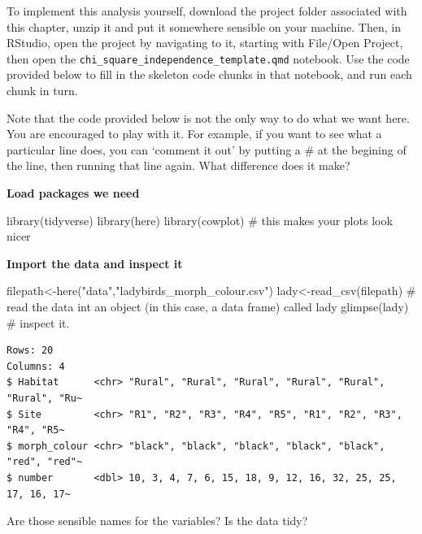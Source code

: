\documentclass[
  letterpaper,
  DIV=11,
  numbers=noendperiod]{scrreprt}
\newenvironment{Shaded}{\begin{snugshade}}{\end{snugshade}}
\newcommand{\CommentTok}[1]{\textcolor[rgb]{0.37,0.37,0.37}{#1}}
\newcommand{\FunctionTok}[1]{\textcolor[rgb]{0.28,0.35,0.67}{#1}}
\newcommand{\NormalTok}[1]{\textcolor[rgb]{0.00,0.23,0.31}{#1}}
\newcommand{\OtherTok}[1]{\textcolor[rgb]{0.00,0.23,0.31}{#1}}
\newcommand{\StringTok}[1]{\textcolor[rgb]{0.13,0.47,0.30}{#1}}
\begin{document}
To implement this analysis yourself, download the project folder
associated with this chapter, unzip it and put it somewhere sensible on
your machine. Then, in RStudio, open the project by navigating to it,
starting with File/Open Project, then open the
\texttt{chi\_square\_independence\_template.qmd} notebook. Use the code
provided below to fill in the skeleton code chunks in that notebook, and
run each chunk in turn.

Note that the code provided below is not the only way to do what we want
here. You are encouraged to play with it. For example, if you want to
see what a particular line does, you can `comment it out' by putting a
\# at the begining of the line, then running that line again. What
difference does it make?

\textbf{Load packages we need}

\begin{Shaded}
\begin{Highlighting}[]
\FunctionTok{library}\NormalTok{(tidyverse)}
\FunctionTok{library}\NormalTok{(here)}
\FunctionTok{library}\NormalTok{(cowplot) }\CommentTok{\# this makes your plots look nicer}
\end{Highlighting}
\end{Shaded}

\textbf{Import the data and inspect it}

\begin{Shaded}
\begin{Highlighting}[]
\NormalTok{filepath}\OtherTok{\textless{}{-}}\FunctionTok{here}\NormalTok{(}\StringTok{"data"}\NormalTok{,}\StringTok{"ladybirds\_morph\_colour.csv"}\NormalTok{) }
\NormalTok{lady}\OtherTok{\textless{}{-}}\FunctionTok{read\_csv}\NormalTok{(filepath) }\CommentTok{\# read the data int an object (in this case, a data frame) called lady}
\FunctionTok{glimpse}\NormalTok{(lady) }\CommentTok{\# inspect it.}
\end{Highlighting}
\end{Shaded}

\begin{verbatim}
Rows: 20
Columns: 4
$ Habitat      <chr> "Rural", "Rural", "Rural", "Rural", "Rural", "Rural", "Ru~
$ Site         <chr> "R1", "R2", "R3", "R4", "R5", "R1", "R2", "R3", "R4", "R5~
$ morph_colour <chr> "black", "black", "black", "black", "black", "red", "red"~
$ number       <dbl> 10, 3, 4, 7, 6, 15, 18, 9, 12, 16, 32, 25, 25, 17, 16, 17~
\end{verbatim}

Are those sensible names for the variables? Is the data tidy?
\end{document}
